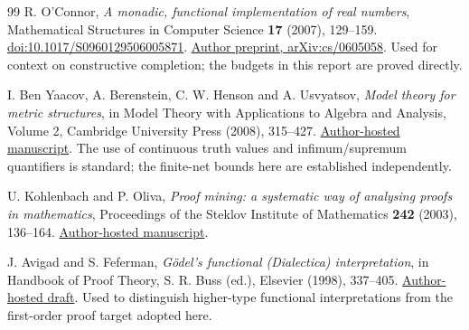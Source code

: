 \begin{thebibliography}{99}
R. O'Connor, \emph{A monadic, functional implementation of real numbers},
Mathematical Structures in Computer Science \textbf{17} (2007), 129--159.
\href{https://doi.org/10.1017/S0960129506005871}{doi:10.1017/S0960129506005871}.
\href{https://arxiv.org/abs/cs/0605058}{Author preprint, arXiv:cs/0605058}.
Used for context on constructive completion; the budgets in this report are
proved directly.

I. Ben Yaacov, A. Berenstein, C. W. Henson and A. Usvyatsov,
\emph{Model theory for metric structures}, in Model Theory with Applications
to Algebra and Analysis, Volume 2, Cambridge University Press (2008), 315--427.
\href{https://math.univ-lyon1.fr/~begnac/articles/mtfms.pdf}{Author-hosted manuscript}.
The use of continuous truth values and infimum/supremum quantifiers is standard;
the finite-net bounds here are established independently.

U. Kohlenbach and P. Oliva, \emph{Proof mining: a systematic way of analysing
proofs in mathematics}, Proceedings of the Steklov Institute of Mathematics
\textbf{242} (2003), 136--164.
\href{https://www.eecs.qmul.ac.uk/~pbo/papers/paper004.pdf}{Author-hosted manuscript}.

J. Avigad and S. Feferman, \emph{G\"odel's functional (Dialectica)
interpretation}, in Handbook of Proof Theory, S. R. Buss (ed.), Elsevier
(1998), 337--405.
\href{https://math.stanford.edu/~feferman/papers/dialectica.pdf}{Author-hosted draft}.
Used to distinguish higher-type functional interpretations from the
first-order proof target adopted here.
\end{thebibliography}

